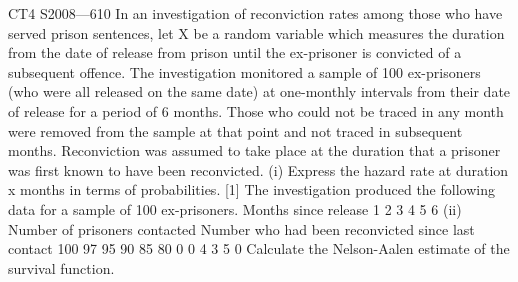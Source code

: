 \documentclass[a4paper,12pt]{article}
\begin{document}
\begin{enumerate}
CT4 S2008—610
In an investigation of reconviction rates among those who have served prison
sentences, let X be a random variable which measures the duration from the date of
release from prison until the ex-prisoner is convicted of a subsequent offence. The
investigation monitored a sample of 100 ex-prisoners (who were all released on the
same date) at one-monthly intervals from their date of release for a period of 6
months. Those who could not be traced in any month were removed from the sample
at that point and not traced in subsequent months. Reconviction was assumed to take
place at the duration that a prisoner was first known to have been reconvicted.
(i)
Express the hazard rate at duration x months in terms of probabilities.
[1]
The investigation produced the following data for a sample of 100 ex-prisoners.
Months since release
1
2
3
4
5
6
(ii)
Number of prisoners
contacted
Number who had
been reconvicted
since last contact
100
97
95
90
85
80
0
0
4
3
5
0
Calculate the Nelson-Aalen estimate of the survival function.


\end{enumerate}
\end{document}
